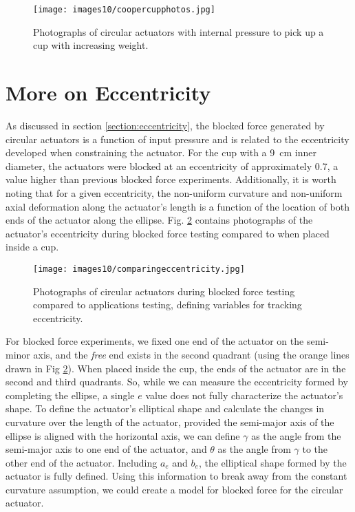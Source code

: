 \begin{figure}[ht]
    \centering
     \texttt{[image: images10/coopercupphotos.jpg]}
    \caption{Photographs of circular actuators with internal pressure to pick up a cup with increasing weight.}
    \label{fig:coopercupphotos}
\end{figure}

\section{More on Eccentricity}

As discussed in section \ref{section:eccentricity}, the blocked force generated by circular actuators is a function of input pressure and is related to the eccentricity developed when constraining the actuator. For the cup with a 9~cm inner diameter, the actuators were blocked at an eccentricity of approximately 0.7, a value higher than previous blocked force experiments. Additionally, it is worth noting that for a given eccentricity, the non-uniform curvature and non-uniform axial deformation along the actuator's length is a function of the location of both ends of the actuator along the ellipse. Fig. \ref{fig:comparingeccentricity} contains photographs of the actuator's eccentricity during blocked force testing compared to when placed inside a cup. 

\begin{figure}[ht]
    \centering
     \texttt{[image: images10/comparingeccentricity.jpg]}
    \caption{Photographs of circular actuators during blocked force testing compared to applications testing, defining variables for tracking eccentricity. }
    \label{fig:comparingeccentricity}
\end{figure}

For blocked force experiments, we fixed one end of the actuator on the semi-minor axis, and the \emph{free} end exists in the second quadrant (using the orange lines drawn in Fig \ref{fig:comparingeccentricity}). When placed inside the cup, the ends of the actuator are in the second and third quadrants. So, while we can measure the eccentricity formed by completing the ellipse, a single $e$ value does not fully characterize the actuator's shape. To define the actuator's elliptical shape and calculate the changes in curvature over the length of the actuator, provided the semi-major axis of the ellipse is aligned with the horizontal axis, we can define $\gamma$ as the angle from the semi-major axis to one end of the actuator, and $\theta$ as the angle from $\gamma$ to the other end of the actuator. Including $a_e$ and $b_e$, the elliptical shape formed by the actuator is fully defined. Using this information to break away from the constant curvature assumption, we could create a model for blocked force for the circular actuator. 
